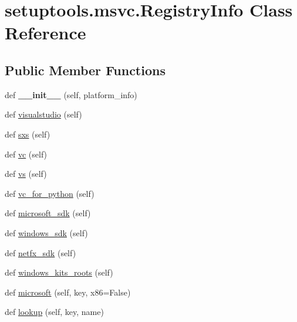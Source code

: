 \hypertarget{classsetuptools_1_1msvc_1_1_registry_info}{}\section{setuptools.\+msvc.\+Registry\+Info Class Reference}
\label{classsetuptools_1_1msvc_1_1_registry_info}
\subsection*{Public Member Functions}
\begin{DoxyCompactItemize}
\item 
\mbox{\label{classsetuptools_1_1msvc_1_1_registry_info_aaf1543da0051dd15ff1198de8fb00dd6}} 
def {\bfseries \+\_\+\+\_\+init\+\_\+\+\_\+} (self, platform\+\_\+info)
\item 
def \hyperlink{classsetuptools_1_1msvc_1_1_registry_info_a0b1853b483f8b7be15c5eb2ee344d856}{visualstudio} (self)
\item 
def \hyperlink{classsetuptools_1_1msvc_1_1_registry_info_a506b2764762140308133a06a02d4285a}{sxs} (self)
\item 
def \hyperlink{classsetuptools_1_1msvc_1_1_registry_info_a15b2a92fa7a73cdab831a78bddeaa9ce}{vc} (self)
\item 
def \hyperlink{classsetuptools_1_1msvc_1_1_registry_info_a2316fd853eba9e0738e067fe1cb50941}{vs} (self)
\item 
def \hyperlink{classsetuptools_1_1msvc_1_1_registry_info_a0b3312fb81aa1413b38c3b334330e008}{vc\+\_\+for\+\_\+python} (self)
\item 
def \hyperlink{classsetuptools_1_1msvc_1_1_registry_info_a5ad942fb235475bd805634ca70652f38}{microsoft\+\_\+sdk} (self)
\item 
def \hyperlink{classsetuptools_1_1msvc_1_1_registry_info_a8702bae8743189fe1c6d3fe77a9f4aa1}{windows\+\_\+sdk} (self)
\item 
def \hyperlink{classsetuptools_1_1msvc_1_1_registry_info_aef785998a7042430dbf6ec449a11d4d8}{netfx\+\_\+sdk} (self)
\item 
def \hyperlink{classsetuptools_1_1msvc_1_1_registry_info_a2fd49f19b9bbfd439af3f9ab604a47ce}{windows\+\_\+kits\+\_\+roots} (self)
\item 
def \hyperlink{classsetuptools_1_1msvc_1_1_registry_info_ac7992b4e588edd0aebb0a33fa266ebc8}{microsoft} (self, key, x86=False)
\item 
def \hyperlink{classsetuptools_1_1msvc_1_1_registry_info_afc91b9bf7451e111733eebb84a3b27f6}{lookup} (self, key, name)
\end{DoxyCompactItemize}

